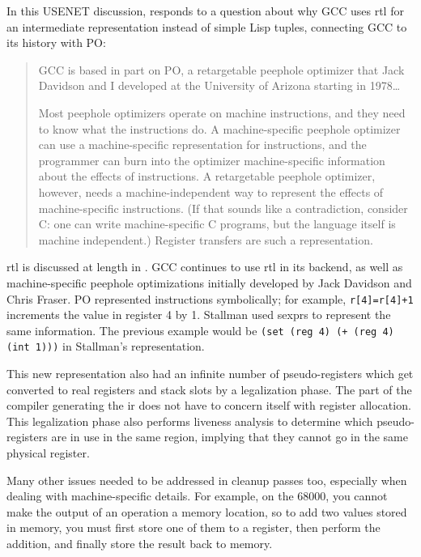 In this USENET discussion, \citeauthor{fraser_register_transfer_language_gcc_usenet_1990}
responds to a question about why GCC uses \acrfull{rtl} for an intermediate representation
instead of simple Lisp tuples, connecting GCC to its history with PO:

\begin{quotation}
	GCC is based in part on PO, a retargetable peephole optimizer that Jack
	Davidson and I developed at the University of Arizona starting in 1978\dots

	Most peephole optimizers operate on machine instructions, and they need to
	know what the instructions do. A machine-specific peephole optimizer can
	use a machine-specific representation for instructions, and the programmer
	can burn into the optimizer machine-specific information about the effects
	of instructions. A retargetable peephole optimizer, however, needs a
	machine-independent way to represent the effects of machine-specific
	instructions. (If that sounds like a contradiction, consider C: one can
	write machine-specific C programs, but the language itself is machine
	independent.) Register transfers are such a representation.
	\parencite{fraser_register_transfer_language_gcc_usenet_1990}
\end{quotation}

\acrshort{rtl} is discussed at length in \parencite{davidson_regalloc_peephole_ops_rtl_1984}.
GCC continues to use \acrshort{rtl} in its backend, as well as machine-specific
peephole optimizations initially developed by Jack Davidson and Chris Fraser.
PO represented instructions symbolically; for example, \texttt{r[4]=r[4]+1}
increments the value in register 4 by 1.
Stallman used \gls{sexpr}s to represent the same information.
The previous example would be \texttt{(set (reg 4) (+ (reg 4) (int 1)))} in
Stallman's representation.

This new representation also had an infinite number of pseudo-registers
which get converted to real registers and stack slots by a legalization phase.
The part of the compiler generating the \acrshort{ir} does not have to
concern itself with register allocation.
This legalization phase also performs liveness analysis to determine which
pseudo-registers are in use in the same region, implying that they cannot
go in the same physical register.

Many other issues needed to be addressed in cleanup passes too,
especially when dealing with machine-specific details.
For example, on the 68000, you cannot make the output of an operation a
memory location, so to add two values stored in memory, you must first store
one of them to a register, then perform the addition, and finally store the
result back to memory.

